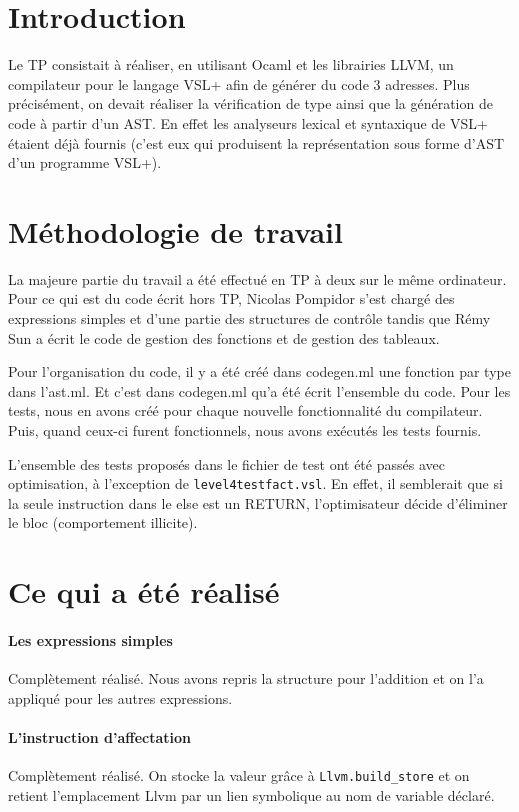\documentclass{article}
\begin{document}
\section{Introduction}

Le TP consistait à réaliser, en utilisant Ocaml et les librairies LLVM, un compilateur pour le 
langage VSL+ afin de générer du code 3 adresses. Plus précisément, on devait réaliser la 
vérification de type ainsi que la génération de code à partir d'un AST. En effet les analyseurs lexical 
et syntaxique de VSL+ étaient déjà fournis (c'est eux qui produisent la représentation sous forme 
d'AST d'un programme VSL+).

\section{Méthodologie de travail}

La majeure partie du travail a été effectué en TP  à deux sur le même
ordinateur. Pour ce qui est du code écrit hors TP, Nicolas Pompidor s'est chargé
des expressions simples et d'une partie des structures de contrôle tandis que
Rémy Sun a écrit le code de gestion des fonctions et de gestion des tableaux.

Pour l'organisation du code, il y a été créé dans codegen.ml une fonction par type dans 
l'ast.ml. Et c'est dans codegen.ml qu'a été écrit l'ensemble du code.
Pour les tests, nous en avons créé pour chaque nouvelle fonctionnalité du compilateur. Puis, 
quand ceux-ci furent fonctionnels, nous avons exécutés les tests fournis.

L'ensemble des tests proposés dans le fichier de test ont été passés avec
optimisation, à l'exception de \texttt{level4testfact.vsl}. En effet, il
semblerait que si la seule instruction dans le else est un RETURN,
l'optimisateur décide d'éliminer le bloc (comportement illicite).

\section{Ce qui a été réalisé}

\paragraph{Les expressions simples}
Complètement réalisé.
Nous avons repris la structure pour l'addition et on l'a appliqué pour les autres expressions.
 
\paragraph{L'instruction d'affectation}
 Complètement réalisé.
On stocke la valeur grâce à \texttt{Llvm.build\_store} et on retient
l'emplacement Llvm par un lien symbolique au nom de variable déclaré.
\end{document}
